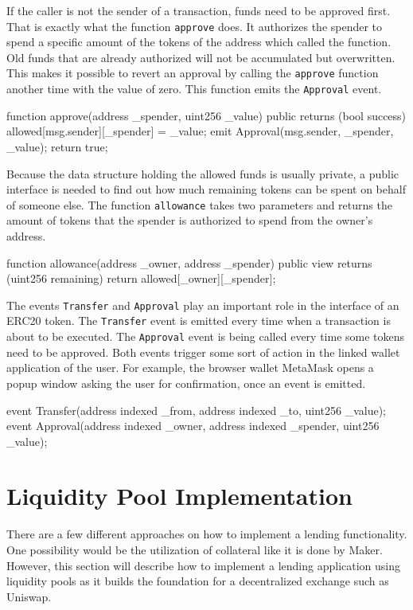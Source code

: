 If the caller is not the sender of a transaction, funds need to be approved first. That is exactly what the function \texttt{approve} does. It authorizes the spender to spend a specific amount of the tokens of the address which called the function. Old funds that are already authorized will not be accumulated but overwritten. This makes it possible to revert an approval by calling the \texttt{approve} function another time with the value of zero. This function emits the \texttt{Approval} event.
\begin{GenericCode}
function approve(address _spender, uint256 _value) public returns (bool success) {
  allowed[msg.sender][_spender] = _value;
  emit Approval(msg.sender, _spender, _value);
  return true;
}
\end{GenericCode}

Because the data structure holding the allowed funds is usually private, a public interface is needed to find out how much remaining tokens can be spent on behalf of someone else. The function \texttt{allowance} takes two parameters and returns the amount of tokens that the spender is authorized to spend from the owner's address.
\begin{GenericCode}
function allowance(address _owner, address _spender) public view returns (uint256 remaining) {
  return allowed[_owner][_spender];
}
\end{GenericCode}

The events \texttt{Transfer} and \texttt{Approval} play an important role in the interface of an ERC20 token. The \texttt{Transfer} event is emitted every time when a transaction is about to be executed. The \texttt{Approval} event is being called every time some tokens need to be approved. Both events trigger some sort of action in the linked wallet application of the user. For example, the browser wallet MetaMask opens a popup window asking the user for confirmation, once an event is emitted. 
\begin{GenericCode}
event Transfer(address indexed _from, address indexed _to, uint256 _value);
event Approval(address indexed _owner, address indexed _spender, uint256 _value);
\end{GenericCode}

\section{Liquidity Pool Implementation}
There are a few different approaches on how to implement a lending functionality. One possibility would be the utilization of collateral like it is done by Maker\cite{MakerDAO2021}. However, this section will describe how to implement a lending application using liquidity pools as it builds the foundation for a decentralized exchange such as Uniswap\cite{Uniswap2020}.

